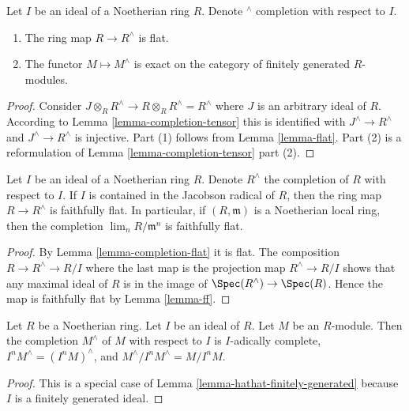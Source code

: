 \begin{lemma}
\label{lemma-completion-flat}
Let $I$ be an ideal of a Noetherian ring $R$.
Denote ${}^\wedge$ completion with respect to $I$.
\begin{enumerate}
\item The ring map $R \to R^\wedge$ is flat.
\item The functor $M \mapsto M^\wedge$ is exact on the category of
finitely generated $R$-modules.
\end{enumerate}
\end{lemma}

\begin{proof}
Consider $J \otimes_R R^\wedge \to R \otimes_R R^\wedge = R^\wedge$
where $J$ is an arbitrary ideal of $R$.
According to Lemma \ref{lemma-completion-tensor} this
is identified with $J^\wedge \to R^\wedge$ and $J^\wedge \to R^\wedge$
is injective. Part (1) follows from Lemma \ref{lemma-flat}.
Part (2) is a reformulation of
Lemma \ref{lemma-completion-tensor} part (2).
\end{proof}

\begin{lemma}
\label{lemma-completion-faithfully-flat}
Let $I$ be an ideal of a Noetherian ring $R$. Denote $R^\wedge$
the completion of $R$ with respect to $I$. If $I$ is contained
in the Jacobson radical of $R$, then the ring map $R \to R^\wedge$
is faithfully flat. In particular, if $(R, \mathfrak m)$ is a Noetherian
local ring, then the completion $\lim_n R/\mathfrak m^n$ is faithfully flat.
\end{lemma}

\begin{proof}
By Lemma \ref{lemma-completion-flat} it is flat.
The composition $R \to R^\wedge \to R/I$ where
the last map is the projection map $R^\wedge \to R/I$ shows that
any maximal ideal of $R$ is in the image of $\Spec(R^\wedge)
\to \Spec(R)$. Hence the map is faithfully
flat by Lemma \ref{lemma-ff}.
\end{proof}

\begin{lemma}
\label{lemma-completion-complete}
Let $R$ be a Noetherian ring.
Let $I$ be an ideal of $R$.
Let $M$ be an $R$-module.
Then the completion $M^\wedge$
of $M$ with respect to $I$ is $I$-adically complete,
$I^n M^\wedge = (I^nM)^\wedge$, and $M^\wedge/I^nM^\wedge = M/I^nM$.
\end{lemma}

\begin{proof}
This is a special case of
Lemma \ref{lemma-hathat-finitely-generated}
because $I$ is a finitely generated ideal.
\end{proof}

